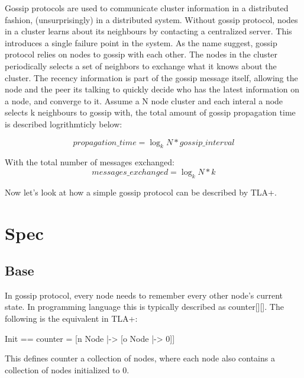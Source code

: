 \documentclass{report}
\begin{document}
Gossip protocols are used to communicate cluster information in a distributed
fashion, (unsurprisingly) in a distributed system. Without gossip protocol, 
nodes in a cluster learns about its neighbours by contacting a centralized
server. This introduces a single failure point in the system. As the name
suggest, gossip protocol relies on nodes to gossip with each other. The nodes in
the cluster periodically selects a set of neighbors to exchange what it knows
about the cluster. The recency information is part of the gossip message
itself, allowing the node and the peer its talking to quickly decide who has the
latest information on a node, and converge to it. Assume a N node cluster and
each interal a node selects k neighbours to gossip with, the total amount of
gossip propagation time is described logrithmticly below:

\begin{equation} 
    propagation\_time = \log_k N * gossip\_interval
\end{equation}

With the total number of messages exchanged: 
\begin{equation} 
    messages\_exchanged = \log_k N * k
\end{equation}

Now let's look at how a simple gossip protocol can be described by TLA+.

\section{Spec}

\subsection{Base}

In gossip protocol, every node needs to remember every other node's current
state. In programming language this is typically described as counter[][]. The following is
the equivalent in TLA+: 
\begin{tla}
    Init == counter = [n \in Node |-> [o \in Node |-> 0]] 
\end{tla}
\begin{tlatex}
\end{tlatex}

This defines counter a collection of nodes, where each node also contains a
collection of nodes initialized to 0.\newline
\end{document}
